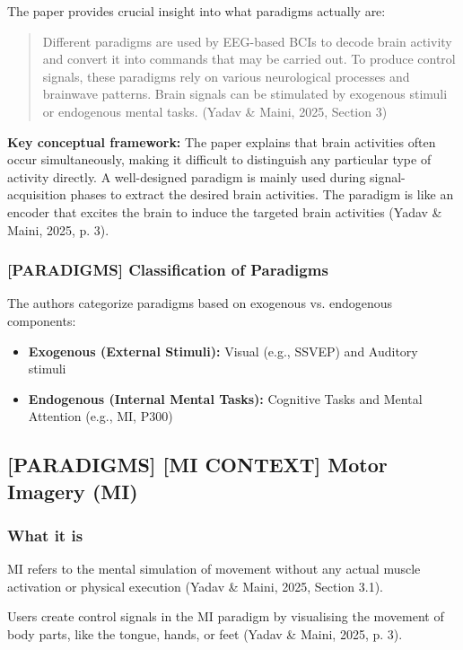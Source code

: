 \documentclass[12pt]{article}
\begin{document}
The paper provides crucial insight into what paradigms actually are:

\begin{quote}
Different paradigms are used by EEG-based BCIs to decode brain activity and convert it into commands that may be carried out. To produce control signals, these paradigms rely on various neurological processes and brainwave patterns. Brain signals can be stimulated by exogenous stimuli or endogenous mental tasks. (Yadav \& Maini, 2025, Section 3)
\end{quote}

\textbf{Key conceptual framework:} The paper explains that brain activities often occur simultaneously, making it difficult to distinguish any particular type of activity directly. A well-designed paradigm is mainly used during signal-acquisition phases to extract the desired brain activities. The paradigm is like an encoder that excites the brain to induce the targeted brain activities (Yadav \& Maini, 2025, p. 3).

\subsubsection{[PARADIGMS] Classification of Paradigms}

The authors categorize paradigms based on exogenous vs. endogenous components:
\begin{itemize}
    \item \textbf{Exogenous (External Stimuli):} Visual (e.g., SSVEP) and Auditory stimuli
    \item \textbf{Endogenous (Internal Mental Tasks):} Cognitive Tasks and Mental Attention (e.g., MI, P300)
\end{itemize}

\subsection{[PARADIGMS] [MI CONTEXT] Motor Imagery (MI)}

\subsubsection{What it is}

MI refers to the mental simulation of movement without any actual muscle activation or physical execution (Yadav \& Maini, 2025, Section 3.1).

Users create control signals in the MI paradigm by visualising the movement of body parts, like the tongue, hands, or feet (Yadav \& Maini, 2025, p. 3).
\end{document}
